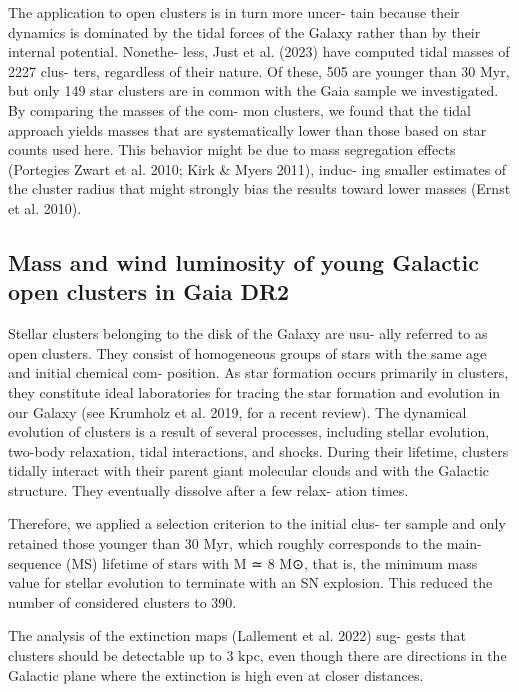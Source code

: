\documentclass[../main.tex]{subfiles}
\begin{document}
{The application to open clusters is in turn more uncer-
tain because their dynamics is dominated by the tidal forces
of the Galaxy rather than by their internal potential. Nonethe-
less, Just et al. (2023) have computed tidal masses of 2227 clus-
ters, regardless of their nature. Of these, 505 are younger than
30 Myr, but only 149 star clusters are in common with the Gaia
sample we investigated. By comparing the masses of the com-
mon clusters, we found that the tidal approach yields masses
that are systematically lower than those based on star counts
used here. This behavior might be due to mass segregation
eﬀects (Portegies Zwart et al. 2010; Kirk & Myers 2011), induc-
ing smaller estimates of the cluster radius that might strongly
bias the results toward lower masses (Ernst et al. 2010).



\subsection{Mass and wind luminosity of young Galactic open clusters in Gaia DR2}


Stellar clusters belonging to the disk of the Galaxy are usu-
ally referred to as open clusters. They consist of homogeneous
groups of stars with the same age and initial chemical com-
position. As star formation occurs primarily in clusters, they
constitute ideal laboratories for tracing the star formation and
evolution in our Galaxy (see Krumholz et al. 2019, for a recent
review). The dynamical evolution of clusters is a result of several
processes, including stellar evolution, two-body relaxation, tidal
interactions, and shocks. During their lifetime, clusters tidally
interact with their parent giant molecular clouds and with the
Galactic structure. They eventually dissolve after a few relax-
ation times.

Therefore, we applied a selection criterion to the initial clus-
ter sample and only retained those younger than 30 Myr, which
roughly corresponds to the main-sequence (MS) lifetime of stars
with M ≃ 8 M⊙, that is, the minimum mass value for stellar
evolution to terminate with an SN explosion. This reduced the
number of considered clusters to 390.

The analysis of the extinction maps (Lallement et al. 2022) sug-
gests that clusters should be detectable up to 3 kpc, even though
there are directions in the Galactic plane where the extinction is
high even at closer distances.

}
\end{document}
